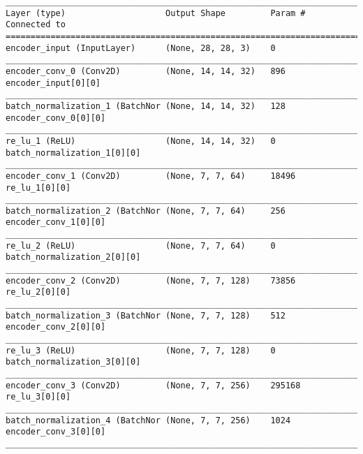 \begin{lstlisting}[caption={\textsc{Mnist}-\ac{VAE} Encoder},captionpos=b,basicstyle=\tiny, label={lst:mnist-vae-encoder}]
__________________________________________________________________________________________________
Layer (type)                    Output Shape         Param #     Connected to
==================================================================================================
encoder_input (InputLayer)      (None, 28, 28, 3)    0
__________________________________________________________________________________________________
encoder_conv_0 (Conv2D)         (None, 14, 14, 32)   896         encoder_input[0][0]
__________________________________________________________________________________________________
batch_normalization_1 (BatchNor (None, 14, 14, 32)   128         encoder_conv_0[0][0]
__________________________________________________________________________________________________
re_lu_1 (ReLU)                  (None, 14, 14, 32)   0           batch_normalization_1[0][0]
__________________________________________________________________________________________________
encoder_conv_1 (Conv2D)         (None, 7, 7, 64)     18496       re_lu_1[0][0]
__________________________________________________________________________________________________
batch_normalization_2 (BatchNor (None, 7, 7, 64)     256         encoder_conv_1[0][0]
__________________________________________________________________________________________________
re_lu_2 (ReLU)                  (None, 7, 7, 64)     0           batch_normalization_2[0][0]
__________________________________________________________________________________________________
encoder_conv_2 (Conv2D)         (None, 7, 7, 128)    73856       re_lu_2[0][0]
__________________________________________________________________________________________________
batch_normalization_3 (BatchNor (None, 7, 7, 128)    512         encoder_conv_2[0][0]
__________________________________________________________________________________________________
re_lu_3 (ReLU)                  (None, 7, 7, 128)    0           batch_normalization_3[0][0]
__________________________________________________________________________________________________
encoder_conv_3 (Conv2D)         (None, 7, 7, 256)    295168      re_lu_3[0][0]
__________________________________________________________________________________________________
batch_normalization_4 (BatchNor (None, 7, 7, 256)    1024        encoder_conv_3[0][0]
__________________________________________________________________________________________________

\end{lstlisting}
